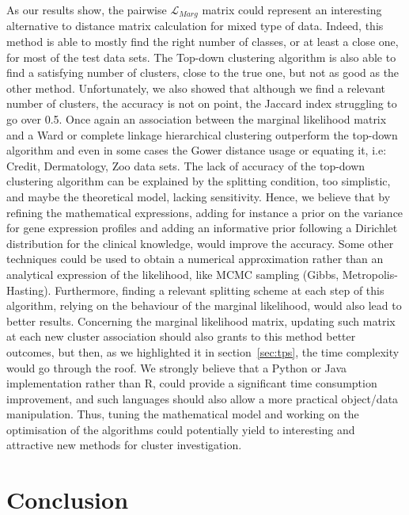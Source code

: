 \documentclass[twocolumn]{article}
\begin{document}
As our results show, the pairwise $\mathcal{L}_{Marg}$ matrix could represent an interesting alternative to distance matrix calculation for mixed type of data.
Indeed, this method is able to mostly find the right number of classes, or at least a close one, for most of the test data sets.
The Top-down clustering algorithm is also able to find a satisfying number of clusters, close to the true one, but not as good as the other method.
Unfortunately, we also showed that although we find a relevant number of clusters, the accuracy is not on point, the Jaccard index struggling to go over 0.5.
Once again an association between the marginal likelihood matrix and a Ward or complete linkage hierarchical clustering outperform the top-down algorithm and even in some cases the Gower distance usage or equating it, i.e: Credit, Dermatology, Zoo data sets.
The lack of accuracy of the top-down clustering algorithm can be explained by the splitting condition, too simplistic, and maybe the theoretical model, lacking sensitivity.
Hence, we believe that by refining the mathematical expressions, adding for instance a prior on the variance for gene expression profiles and adding an informative prior following a Dirichlet distribution for the clinical knowledge, would improve the accuracy.
Some other techniques could be used to obtain a numerical approximation rather than an analytical expression of the likelihood, like MCMC sampling (Gibbs, Metropolis-Hasting).
Furthermore, finding a relevant splitting scheme at each step of this algorithm, relying on the behaviour of the marginal likelihood, would also lead to better results.
Concerning the marginal likelihood matrix, updating such matrix at each new cluster association should also grants to this method better outcomes, but then, as we highlighted it in section~\ref{sec:tps}, the time complexity would go through the roof.
We strongly believe that a Python or Java implementation rather than R, could provide a significant time consumption improvement, and such languages should also allow a more practical object/data manipulation.
Thus, tuning the mathematical model and working on the optimisation of the algorithms could potentially yield to interesting and attractive new methods for cluster investigation.

\section{Conclusion}
\end{document}
